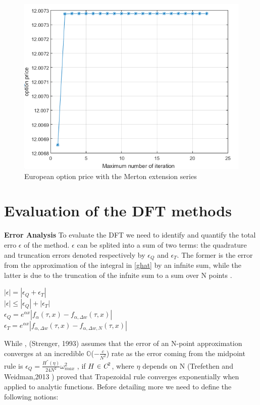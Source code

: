 \documentclass[12pt]{report}
\begin{document}
\begin{figure}[H]
\centering
\includegraphics{maxiteration.png} 
\caption{ European option price with the Merton extension series}
\end{figure}


\section{Evaluation of the DFT methods }
\textbf{Error Analysis }
To evaluate the DFT we need to identify and quantify the total erro $\epsilon$ of the method.
 $\epsilon$ can be splited into a sum of two terms: the quadrature and truncation errors denoted respectively by $\epsilon_Q$ and $\epsilon_T$. The former is the error from the approximation of the integral in \eqref{ghat} by an infnite sum, while the latter is due to the truncation of the infnite sum to a sum over N points .\\
\begin{center}
$|\epsilon|=|\epsilon_Q+\epsilon_T|$\\
$|\epsilon| \leq |\epsilon_Q|+|\epsilon_T|$\\
$\epsilon_Q=e^{\alpha x }|f_{\alpha}(\tau,x)-f_{\alpha,\Delta w }(\tau,x)|$\\
$\epsilon_T=e^{\alpha x }|f_{\alpha,\Delta w }(\tau,x)-f_{\alpha,\Delta w, N }(\tau,x)|$
\end{center}




 While , (Strenger, 1993) assumes that the error of an N-point approximation converges at an incredible $\mathbb{O}$($-\frac{c}{N^2}$) rate as the  error coming from the midpoint rule is  $\epsilon_Q=\frac{H^{''}(\eta)}{24N^2} \omega_{max}^2$ , if 
 $H$ $\in  \emph{C}^2$, where $\eta$ depends on N (Trefethen and Weidman,2013 ) proved that Trapezoidal rule converges exponentially when applied to analytic functions.
Before detailing more we need to define the following notions:
\end{document}
